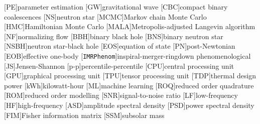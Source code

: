 \documentclass[prd,twocolumn,a4paper,floatfix,nofootinbib,preprintnumbers,superscriptaddress]{revtex4-1}
\begin{document}
\appendix

\begin{acronym}
    [PE]{parameter estimation}
    [GW]{gravitational wave}
    [CBC]{compact binary coalescences}
    [NS]{neutron star}
    [MCMC]{Markov chain Monte Carlo}
    [HMC]{Hamiltonian Monte Carlo}
    [MALA]{Metropolis-adjusted Langevin algorithm}
    [NF]{normalizing flow}
    [BBH]{binary black hole}
    [BNS]{binary neutron star}
    [NSBH]{neutron star-black hole}
    [EOS]{equation of state}
    [PN]{post-Newtonian}
    [EOB]{effective one-body}
    [\texttt{IMRPhenom}]{inspiral-merger-ringdown phenomenological}
    [JS]{Jensen-Shannon}
    [p-p]{percentile-percentile}
    [CPU]{central processing unit}
    [GPU]{graphical processing unit}
    [TPU]{tensor processing unit}
    [TDP]{thermal design power}
    [kWh]{kilowatt-hour}
    [ML]{machine learning}
    [ROQ]{reduced order quadrature}
    [ROM]{reduced order modelling}
    [SNR]{signal-to-noise ratio}
    [LF]{low-frequency}
    [HF]{high-frequency}
    [ASD]{amplitude spectral density}
    [PSD]{power spectral density}
    [FIM]{Fisher information matrix}
    [SSM]{subsolar mass }
\end{acronym}

{}

\end{document}
